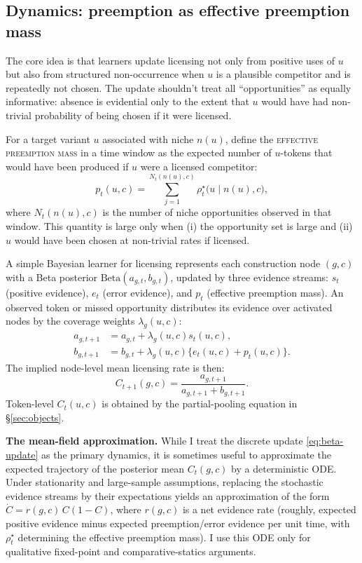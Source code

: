 \documentclass[12pt,letterpaper]{article}
\newcommand{\term}[1]{\textsc{#1}}
\begin{document}
\subsection{Dynamics: preemption as effective preemption mass}
\label{sec:update}

The core idea is that
learners update licensing not only from positive uses of $u$ but also from
structured non-occurrence when $u$ is a plausible competitor and is repeatedly
not chosen. The update shouldn't treat all \enquote{opportunities} as equally
informative: absence is evidential only to the extent that $u$ would have had
non-trivial probability of being chosen if it were licensed.

For a target variant $u$ associated with niche $n(u)$, define the \term{effective
preemption mass} in a time window as the expected number of $u$-tokens that would
have been produced if $u$ were a licensed competitor:
\begin{equation*}
p_t(u,c)
=\sum_{j=1}^{N_t(n(u),c)}
\rho_t^\star\!\bigl(u\mid n(u),c\bigr),
\end{equation*}
where $N_t(n(u),c)$ is the number of niche opportunities observed in that window.
This quantity is large only when (i) the opportunity set is large and (ii) $u$
would have been chosen at non-trivial rates if licensed.

A simple Bayesian learner for licensing represents each construction node
$(g,c)$ with a Beta posterior $\mathrm{Beta}(a_{g,t},b_{g,t})$, updated by three evidence streams:
$s_t$ (positive evidence), $e_t$ (error evidence), and $p_t$ (effective preemption mass).
An observed token or missed opportunity distributes its evidence over activated
nodes by the coverage weights $\lambda_g(u,c)$:
\begin{align*}
a_{g,t+1} &= a_{g,t}+\lambda_g(u,c)s_t(u,c),\\
b_{g,t+1} &= b_{g,t}+\lambda_g(u,c)\{e_t(u,c)+p_t(u,c)\}.
\end{align*}
The implied node-level mean licensing rate is then:
\begin{equation}\label{eq:beta-update}
C_{t+1}(g,c)=\frac{a_{g,t+1}}{a_{g,t+1}+b_{g,t+1}}.
\end{equation}
Token-level $C_t(u,c)$ is obtained by the partial-pooling equation in
\S\ref{sec:objects}.

\begin{note}
\textbf{The mean-field approximation.} While I treat the discrete update \eqref{eq:beta-update} as the primary dynamics, it is sometimes useful to approximate the expected trajectory of the posterior mean $C_t(g,c)$ by a deterministic ODE. Under stationarity and large-sample assumptions, replacing the stochastic evidence streams by their expectations yields an approximation of the form $\dot{C}=r(g,c)\,C(1-C)$, where $r(g,c)$ is a net evidence rate (roughly, expected positive evidence minus expected preemption/error evidence per unit time, with $\rho_t^\star$ determining the effective preemption mass). I use this ODE only for qualitative fixed-point and comparative-statics arguments.
\end{note}
\end{document}

